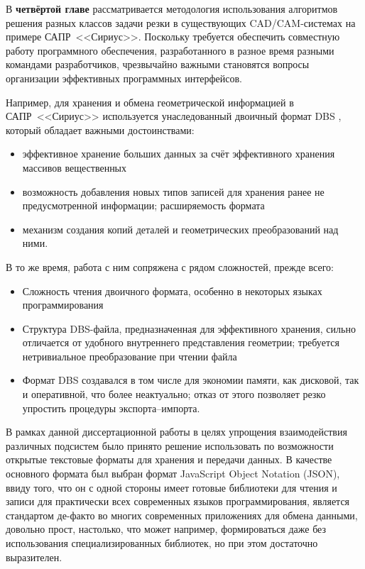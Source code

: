 
В {\bf четвёртой главе}
рассматривается методология
использования алгоритмов решения
разных классов задачи резки в существующих
CAD/CAM-системах на примере
САПР~<<Сириус>>.
Поскольку требуется обеспечить
совместную работу программного обеспечения,
разработанного в разное время разными командами разработчиков,
чрезвычайно важными становятся вопросы
организации эффективных программных интерфейсов.

Например, для хранения и обмена геометрической информацией
в САПР~<<Сириус>>
используется унаследованный двоичный формат DBS
\autocite{bi:DBS},
который обладает важными достоинствами:
\begin{itemize}
  \item
  эффективное хранение больших данных за счёт эффективного хранения массивов вещественных
  \item
  возможность добавления новых типов записей для хранения ранее не предусмотренной информации;
  расширяемость формата
  \item
  механизм создания копий деталей и геометрических преобразований над ними.
\end{itemize}

В то же время,
работа с ним сопряжена с рядом сложностей,
прежде всего:
\begin{itemize}
  \item
  Сложность чтения двоичного формата,
  особенно в некоторых языках программирования
  \item
  Структура DBS-файла,
  предназначенная для эффективного хранения,
  сильно отличается от удобного внутреннего представления
  геометрии;
  требуется нетривиальное преобразование при чтении файла
  \item
  Формат DBS создавался в том числе для экономии памяти,
  как дисковой, так и оперативной,
  что более неактуально;
  отказ от этого позволяет резко упростить процедуры экспорта--импорта.
\end{itemize}

В рамках данной диссертационной работы
в целях упрощения взаимодействия различных подсистем
было принято решение использовать по возможности
открытые текстовые форматы для хранения и передачи данных.
В качестве основного формата был выбран формат
JavaScript Object Notation
\autocite{bi:JSON}
(JSON),
ввиду того, что
он с одной стороны имеет готовые библиотеки для чтения и записи
для практически всех современных языков
программирования,
является стандартом де-факто во многих
современных приложениях для обмена данными,
довольно прост,
настолько, что может например,
формироваться даже без использования специализированных библиотек,
но при этом достаточно выразителен.


